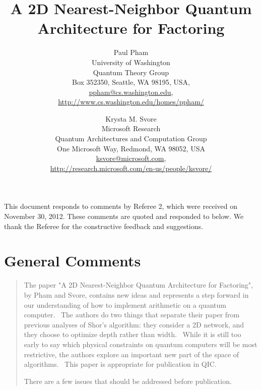 \documentclass{article}
\newcommand{\email}[1]{\href{mailto:#1}{#1}}
\theoremstyle{plain} \newtheorem{lemma}{Lemma}
\begin{document}

\title{A 2D Nearest-Neighbor Quantum Architecture for Factoring}


%
%
\author{Paul Pham\\
University of Washington\\
Quantum Theory Group\\
Box 352350, Seattle, WA 98195, USA,\\
\email{ppham@cs.washington.edu},\\
\url{http://www.cs.washington.edu/homes/ppham/}
\and
Krysta M. Svore\\
Microsoft Research\\
Quantum Architectures and Computation Group\\
One Microsoft Way, Redmond, WA 98052, USA\\
\email{ksvore@microsoft.com},\\
\url{http://research.microsoft.com/en-us/people/ksvore/}
}

\maketitle

This document responds to comments by Referee 2, which were received on
November 30, 2012. These comments are quoted and responded to below.
We thank the Referee for the constructive feedback and suggestions.

\section{General Comments}

\begin{quote}
The paper "A 2D Nearest-Neighbor Quantum Architecture for Factoring",
by Pham and Svore, contains new ideas and represents a step forward
in our understanding of how to implement arithmetic on a quantum
computer.  The authors do two things that separate their paper from
previous analyses of Shor's algorithm: they consider a 2D network,
and they choose to optimize depth rather than width.  While it is
still too early to say which physical constraints on quantum computers
will be most restrictive, the authors explore an important new part
of the space of algorithms.  This paper is appropriate for publication in QIC.

There are a few issues that should be addressed before publication.
\end{quote}
\end{document}
